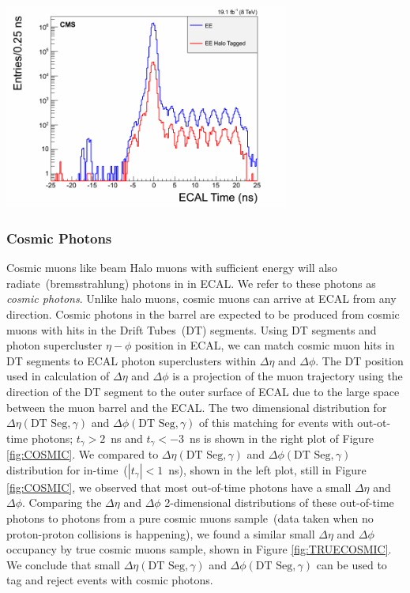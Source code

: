 \begin{minipage}{0.90\linewidth} 
\begin{center}
\centering
\includegraphics[height=0.45\textwidth, width=0.7\textwidth]{THESISPLOTS/halo_EE_Time.png}
\label{fig:HALOENDCAP}
\end{center} 
\end{minipage}

\subsubsection{Cosmic Photons}
Cosmic muons like beam Halo muons with sufficient energy  will also radiate~(bremsstrahlung) photons in in ECAL. We refer to these photons as \textit{cosmic photons}. Unlike halo muons, cosmic muons can arrive at ECAL from any direction. Cosmic photons in the barrel are expected to be produced from cosmic muons with hits in the Drift Tubes~(DT) segments. Using DT segments and  photon supercluster $\eta-\phi$ position in ECAL, we can match cosmic muon hits in DT segments to ECAL photon superclusters within $\Delta\eta$ and $\Delta\phi$. The DT position used in calculation of $\Delta\eta$ and $\Delta\phi$ is a projection of the muon trajectory using the direction of the DT segment to the outer surface of ECAL due to the large space between the muon barrel and the ECAL. The two dimensional distribution for $\Delta\eta(\mbox{DT Seg},\gamma)$ and $\Delta\phi(\mbox{DT Seg},\gamma)$ of this matching for events with out-ot-time photons; $t_{\gamma} > 2$~ns and $t_{\gamma} < -3$~ns is shown in the right plot of Figure \ref{fig:COSMIC}. We compared to $\Delta\eta(\mbox{DT Seg},\gamma)$ and $\Delta\phi(\mbox{DT Seg},\gamma)$ distribution for in-time~($|t_{\gamma}| < 1$~ns), shown in the left plot, still in Figure \ref{fig:COSMIC}, we observed that most out-of-time photons have a small $\Delta\eta$ and $\Delta\phi$. Comparing the $\Delta\eta$  and $\Delta\phi$ 2-dimensional distributions of these out-of-time photons to photons from a pure cosmic muons sample~(data taken when no proton-proton collisions is happening), we found a similar small $\Delta\eta$ and $\Delta\phi$ occupancy by true cosmic muons sample, shown in Figure \ref{fig:TRUECOSMIC}. We conclude that small $\Delta\eta(\mbox{DT Seg},\gamma)$  and $\Delta\phi(\mbox{DT Seg},\gamma)$ can be used to tag and reject events with cosmic photons.

